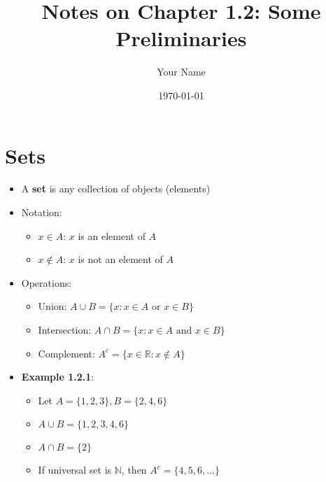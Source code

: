 \documentclass{article}
\title{Notes on Chapter 1.2: Some Preliminaries}
\author{Your Name}
\date{\today}
\begin{document}
\maketitle

\section{Sets}
\begin{itemize}
    \item A \textbf{set} is any collection of objects (elements)
    \item Notation:
    \begin{itemize}
        \item $x \in A$: $x$ is an element of $A$
        \item $x \notin A$: $x$ is not an element of $A$
    \end{itemize}
    \item Operations:
    \begin{itemize}
        \item Union: $A \cup B = \{x : x \in A \text{ or } x \in B\}$
        \item Intersection: $A \cap B = \{x : x \in A \text{ and } x \in B\}$
        \item Complement: $A^c = \{x \in \mathbb{R} : x \notin A\}$
    \end{itemize}
    
    \item \textbf{Example 1.2.1}:
    \begin{itemize}
        \item Let $A = \{1,2,3\}, B = \{2,4,6\}$
        \item $A \cup B = \{1,2,3,4,6\}$
        \item $A \cap B = \{2\}$
        \item If universal set is $\mathbb{N}$, then $A^c = \{4,5,6,\ldots\}$
    \end{itemize}
\end{itemize}
\end{document}
